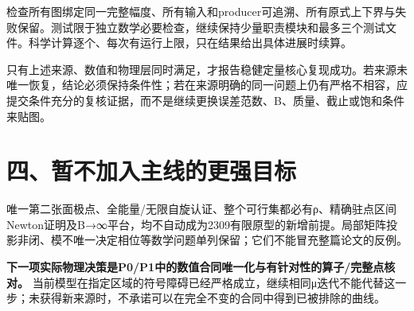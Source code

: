 \documentclass[
  10pt,
  a4paper,
]{article}
\begin{document}
检查所有图绑定同一完整幅度、所有输入和producer可追溯、所有原式上下界与失败保留。测试限于独立数学必要检查，继续保持少量职责模块和最多三个测试文件。科学计算逐个、每次有运行上限，只在结果给出具体进展时续算。

只有上述来源、数值和物理层同时满足，才报告稳健定量核心复现成功。若来源未唯一恢复，结论必须保持条件性；若在来源明确的同一问题上仍有严格不相容，应提交条件充分的复核证据，而不是继续更换误差范数、B、质量、截止或饱和条件来贴图。

\section{四、暂不加入主线的更强目标}\label{ux56dbux6682ux4e0dux52a0ux5165ux4e3bux7ebfux7684ux66f4ux5f3aux76eeux6807}

唯一第二张面极点、全能量/无限自旋认证、整个可行集都必有ρ、精确驻点区间Newton证明及B→∞平台，均不自动成为2309有限原型的新增前提。局部矩阵投影非闭、模不唯一决定相位等数学问题单列保留；它们不能冒充整篇论文的反例。

\textbf{下一项实际物理决策是P0/P1中的数值合同唯一化与有针对性的算子/完整点核对。}
当前模型在指定区域的符号障碍已经严格成立，继续相同μ迭代不能代替这一步；未获得新来源时，不承诺可以在完全不变的合同中得到已被排除的曲线。
\end{document}
